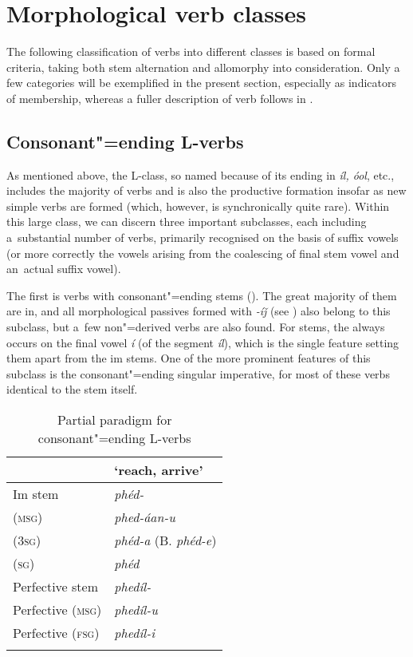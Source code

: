 \section{Morphological verb classes}
\label{sec:8-3}


The following classification of verbs into different classes is based on formal criteria, taking both stem alternation and  allomorphy into consideration. Only a few  categories will be exemplified in the present section, especially as indicators of  membership, whereas a fuller description of verb  follows in .


\subsection{Consonant"=ending L-verbs}
\label{subsec:8-3-1}


As mentioned above, the L-class, so named because of its  ending in \textit{íl, óol}, etc., includes the majority of verbs and is also the productive formation insofar as new simple verbs are formed (which, however, is synchronically quite rare). Within this large class, we can discern three important subclasses, each including a~substantial number of verbs, primarily recognised on the basis of suffix vowels (or more correctly the vowels arising from the coalescing of final stem vowel and an~actual suffix vowel).


The first is verbs with consonant"=ending stems (). The great majority of them are in, and all morphological passives formed with \textit{-íǰ} (see ) also belong to this subclass, but a~few non"=derived  verbs are also found. For  stems, the  always occurs on the final vowel \textit{í} (of the segment \textit{íl}), which is the single feature setting them apart from the im stems. One of the more prominent features of this subclass is the consonant"=ending singular imperative, for most of these verbs identical to the stem itself.


\begin{table}[ht]
\caption{Partial paradigm for consonant"=ending L-verbs}
\begin{tabularx}{.75\textwidth}{ Q Q }
\lsptoprule
&
`reach, arrive'\\\hline
Im stem &
\textit{phéd-} \\
 (\textsc{msg}) &
\textit{phed-áan-u} \\
 (\textsc{3sg}) &
\textit{phéd-a} (B. \textit{phéd-e}) \\
 (\textsc{sg}) &
\textit{phéd} \\
Perfective stem &
\textit{phedíl-} \\
Perfective (\textsc{msg}) &
\textit{phedíl-u} \\
Perfective (\textsc{fsg}) &
\textit{phedíl-i} \\\lspbottomrule
\end{tabularx}
\label{tab:8-4}
\end{table}



